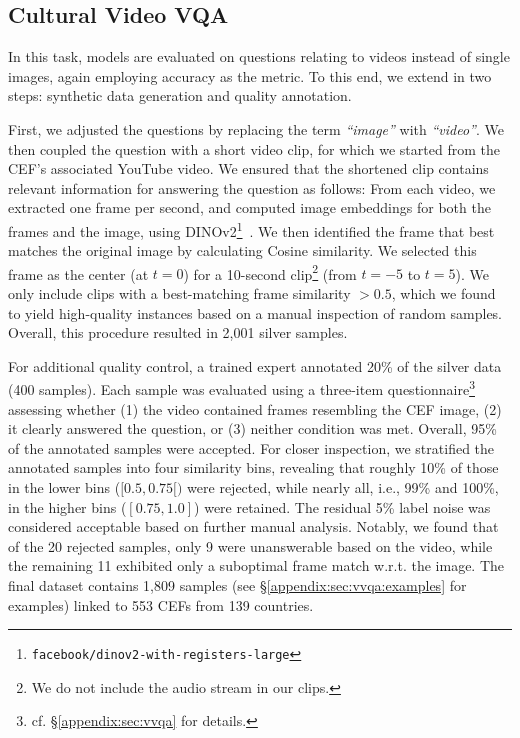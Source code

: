 \subsection{Cultural Video VQA}
\label{sec:vvqa}
%
In this task, models are evaluated on questions relating to videos instead of single images, again employing accuracy as the metric.
%
To this end, we extend \sivqa in two steps: synthetic data generation and quality annotation.
%

\label{sec:vvqa:collection}
%
First, we adjusted the \sivqa questions by replacing the term  \emph{``image''} with \emph{``video''}. We then coupled the question with a short video clip, for which we started from the CEF's associated YouTube video. We ensured that the shortened clip contains relevant information for answering the question as follows:
%
From each video, we extracted one frame per second, and computed image embeddings for both the frames and the \sivqa image, using DINOv2\footnote{\texttt{facebook/dinov2-with-registers-large}}~\cite{oquab2024dinov2,darcet2024dinov2registers}.
%
We then identified the frame that best matches the original image by calculating Cosine similarity. We selected this frame as the center (at $t=0$) for a 10-second clip\footnote{
We do not include the audio stream in our clips.} (from $t=-5$ to $t=5$).
%
We only include clips with a best-matching frame similarity $>0.5$, which we found to yield high-quality instances based on a manual inspection of random samples.
%
Overall, this procedure resulted in 2,001 silver samples.
%

\label{sec:vvqa:collection:annotation}
%
For additional quality control, a trained expert annotated 20\% of the silver data (400 samples).
%
Each sample was evaluated using a three-item questionnaire\footnote{cf. \S\ref{appendix:sec:vvqa} for details.} assessing whether (1) the video contained frames resembling the CEF image, (2) it clearly answered the question, or (3) neither condition was met.
%
Overall, 95\% of the annotated samples were accepted.
%
For closer inspection, we stratified the annotated samples into four similarity bins, revealing that roughly 10\% of those in the lower bins ($[0.5, 0.75[)$ were rejected, while nearly all, i.e., 99\% and 100\%, in the higher bins ($[0.75, 1.0]$) were retained.
%
The residual 5\% label noise was considered acceptable based on further manual analysis.
%
Notably, we found that of the 20 rejected samples, only 9 were unanswerable based on the video, while the remaining 11 exhibited only a suboptimal frame match w.r.t. the \sivqa image.
%
The final \dsname \vvqa dataset contains 1,809 samples (see \S\ref{appendix:sec:vvqa:examples} for examples) linked to 553 CEFs from 139 countries.
%
